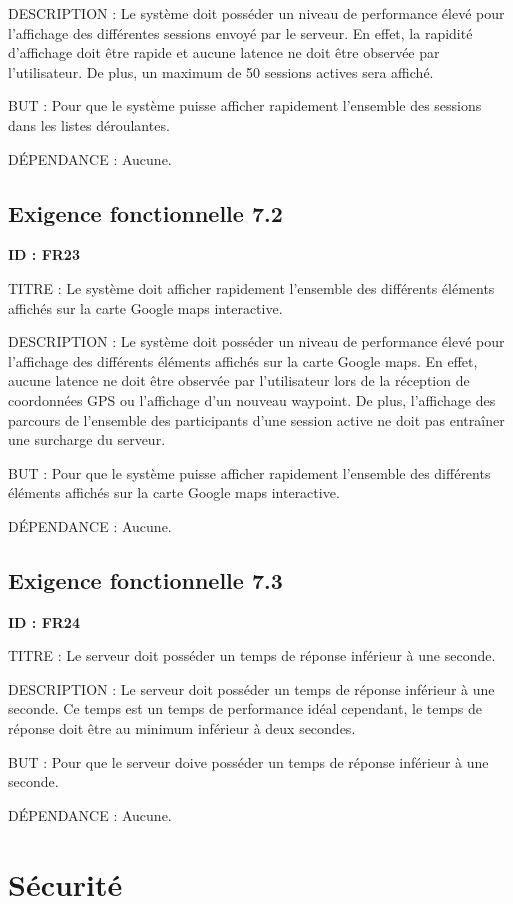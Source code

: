 \documentclass[titlepage, 12pt]{report}
\begin{document}
DESCRIPTION : Le système doit posséder un niveau de performance élevé pour l'affichage des différentes sessions envoyé par le serveur. En effet, la rapidité d'affichage doit être rapide et aucune latence ne doit être observée par l'utilisateur. De plus, un maximum de 50 sessions actives sera affiché. 

BUT : Pour que le système puisse afficher rapidement l'ensemble des sessions dans les listes déroulantes.

DÉPENDANCE : Aucune.

\subsection{Exigence fonctionnelle 7.2}

\textbf{ID : FR23}

TITRE : Le système doit afficher rapidement l'ensemble des différents éléments affichés sur la carte Google maps interactive.

DESCRIPTION : Le système doit posséder un niveau de performance élevé pour l'affichage des différents éléments affichés sur la carte Google maps. En effet, aucune latence ne doit être observée par l'utilisateur lors de la réception de coordonnées GPS ou l'affichage d'un nouveau waypoint. De plus, l'affichage des parcours de l'ensemble des participants d'une session active ne doit pas entraîner une surcharge du serveur. 

BUT : Pour que le système puisse afficher rapidement l'ensemble des différents éléments affichés sur la carte Google maps interactive.

DÉPENDANCE : Aucune.

\subsection{Exigence fonctionnelle 7.3}

\textbf{ID : FR24}

TITRE : Le serveur doit posséder un temps de réponse inférieur à une seconde.

DESCRIPTION : Le serveur doit posséder un temps de réponse inférieur à une seconde. Ce temps est un temps de performance idéal cependant, le temps de réponse doit être au minimum inférieur à deux secondes. 

BUT : Pour que le serveur doive posséder un temps de réponse inférieur à une seconde.

DÉPENDANCE : Aucune.

\section{Sécurité}
\end{document}
